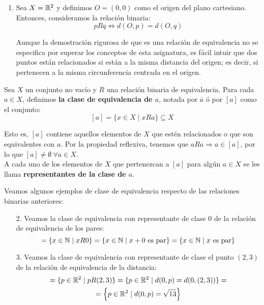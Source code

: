 \begin{ejemplo}
\begin{enumerate}
    \item Sea $X=\mathbb{R}^2$ y definimos $O=(0,0)$ como el origen del plano cartesiano. Entonces, consideramos la relación binaria:
    \begin{equation*}
        pRq \Longleftrightarrow d(O,p) = d(O,q)
    \end{equation*}

    Aunque la demostración rigurosa de que es una relación de equivalencia no se especifica por superar los conceptos de esta asignatura, es fácil intuir que dos puntos están relacionados si están a la misma distancia del origen; es decir, si pertenecen a la misma circunferencia centrada en el origen.
\end{enumerate}
\end{ejemplo}

\begin{definicion}
    Sea $X$ un conjunto no vacío y $R$ una relación binaria de equivalencia. Para cada $a \in X$, definimos \textbf{la clase de equivalencia de $a$}, notada por $\overline{a}$ ó por $[a]$ como el conjunto:
    $$[a] = \{x \in X \mid xRa\} \subseteq X$$
\end{definicion}

Esto es, $[a]$ contiene aquellos elementos de $X$ que estén relacionados o que son equivalentes con $a$.
Por la propiedad reflexiva, tenemos que $aRa \Rightarrow a \in [a]$, por lo que $ [a] \neq \emptyset~\forall a \in X$.\\


A cada uno de los elementos de $X$ que pertenezcan a $[a]$ para algún $a \in X$ se les llama \textbf{representantes de la clase de $a$}.

\begin{ejemplo} Veamos algunos ejemplos de clase de equivalencia respecto de las relaciones binarias anteriores:
\begin{enumerate}
    \item[2.] Veamos la clase de equivalencia con representante de clase $0$ de la relación de equivalencia de los pares:
    \begin{equation*}
        [0] = \{x\in \bb{N}\mid xR0\} = \{x\in \bb{N}\mid x+0 \text{ es par}\} = \{x\in \bb{N}\mid x \text{ es par}\}
    \end{equation*}

    \item[3.] Veamos la clase de equivalencia con representante de clase el punto $(2,3)$ de la relación de equivalencia de la distancia:
    \begin{multline*}
        [(2,3)] = \{p\in \bb{R}^2\mid pR(2,3)\} = \{p\in \bb{R}^2\mid d(0,p)=d(0,(2,3))\} =\\= \left\{p\in \bb{R}^2\mid d(0,p)=\sqrt{13}\right\}
    \end{multline*}
\end{enumerate}
\end{ejemplo}

